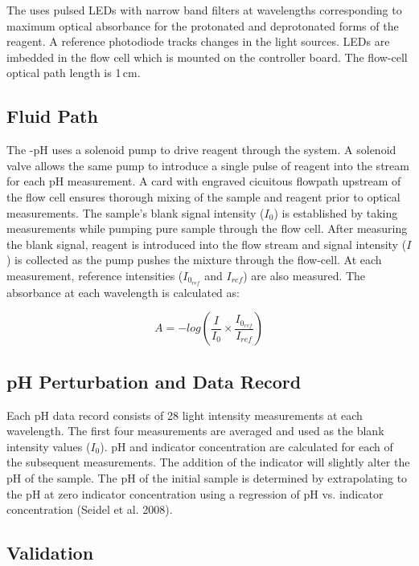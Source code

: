 The \instType{} uses pulsed LEDs with narrow band filters at wavelengths corresponding to maximum optical absorbance for the protonated and deprotonated forms of the reagent.  A reference photodiode tracks changes in the light sources.  LEDs are imbedded in the flow cell which is mounted on the controller board.  The flow-cell optical path length is 1\,cm. 


\subsection{Fluid Path}

The \instType{}-pH uses a \ifcase {}  \fi solenoid pump to drive reagent through the system. A solenoid valve allows the same pump to introduce a single pulse of reagent into the stream for each pH measurement. A card with engraved cicuitous flowpath upstream of the flow cell ensures thorough mixing of the sample and reagent prior to optical measurements. The sample's blank signal intensity ($I_0$) is established by taking measurements while pumping pure sample through the flow cell.  After measuring the blank signal, reagent is introduced into the flow stream and signal intensity ($I$) is collected as the pump pushes the mixture through the flow-cell.  At each measurement, reference intensities ($I_{0_{ref}}$ and $I_{ref}$) are also measured.  The absorbance at each wavelength is calculated as:

\begin{equation}
\label{eq:Abs}
A = -log \left( \frac{I}{I_0}\times \frac{I_{0_{ref}}}{I_{ref}} \right)
\end{equation}


\subsection{pH Perturbation and Data Record}

Each pH data record consists of 28 light intensity measurements at each wavelength.  The first four measurements are averaged and used as the blank intensity values ($I_0$).  pH and indicator concentration are calculated for each of the subsequent measurements.  The addition of the \mCP indicator will slightly alter the pH of the sample. The pH of the initial sample is determined by extrapolating to the pH at zero indicator concentration using a regression of pH vs. indicator concentration (Seidel et al. 2008).


\subsection{Validation}


